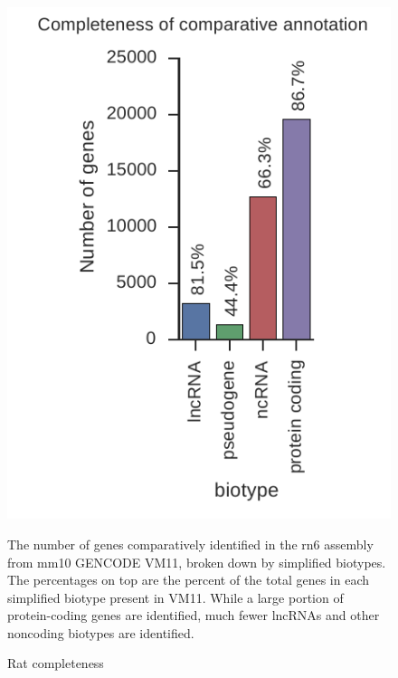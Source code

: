 \documentclass[fleqn,10pt]{wlscirep}
\begin{document}
\begin{figure}
\centering
\includegraphics[]{rat_completeness.pdf}
\caption{Rat completeness}
The number of genes comparatively identified in the rn6 assembly from mm10 GENCODE VM11, broken down by simplified biotypes. The percentages on top are the percent of the total genes in each simplified biotype present in VM11. While a large portion of protein-coding genes are identified, much fewer lncRNAs and other noncoding biotypes are identified.
\label{supp_fig:rat_completeness}
\end{figure}
\end{document}
